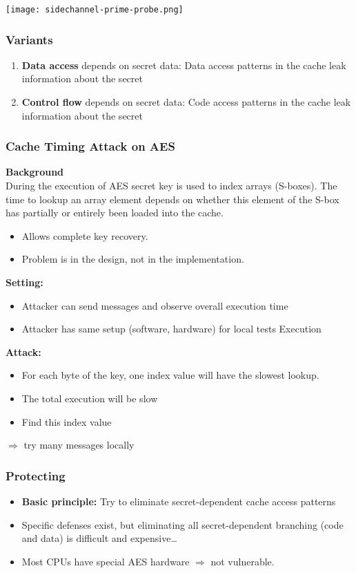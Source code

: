 \texttt{[image: sidechannel-prime-probe.png]}


\subsubsection{Variants}
\begin{enumerate}
  \item \textbf{Data access} depends on secret data: Data access patterns
    in the cache leak information about the secret
  \item \textbf{Control flow} depends on secret data: Code access
    patterns in the cache leak information about the secret
\end{enumerate}
\subsubsection{Cache Timing Attack on AES}
\textbf{Background}\\
During the execution of AES secret key is used to
index arrays (S-boxes). The time to lookup an array element depends
on whether this element of the S-box has partially or entirely been loaded into the
cache.
\begin{itemize}
  \item Allows complete key recovery.
  \item Problem is in the design, not in the implementation.
\end{itemize}

\textbf{Setting:}
\begin{itemize}
  \item Attacker can send messages and observe overall execution time
  \item Attacker has same setup (software, hardware) for local tests
    Execution
\end{itemize}

\textbf{Attack:}
\begin{itemize}
  \item For each byte of the key, one index value will have the slowest lookup.
  \item The total execution will be slow
  \item Find this index value
\end{itemize}
$\Rightarrow$  try many messages locally


\subsubsection{Protecting}
\begin{itemize}
  \item \textbf{Basic principle:}
    Try to eliminate secret-dependent cache access patterns
  \item Specific defenses exist, but eliminating all secret-dependent
    branching (code and data) is difficult and expensive…
  \item Most CPUs have special AES hardware  $\Rightarrow$ not vulnerable.
\end{itemize}

